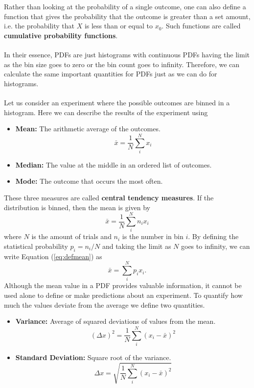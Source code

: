         Rather than looking at the probability of a single outcome, one can also define a function that gives the probability that the outcome is greater than a set amount, i.e. the probability that $X$ is less than or equal to $x_0$. Such functions are called \textbf{cumulative probability functions}.\\
        \\
        In their essence, PDFs are just histograms with continuous PDFs having the limit as the bin size goes to zero or the bin count goes to infinity. Therefore, we can calculate the same important quantities for PDFs just as we can do for histograms.\\
        \\
        Let us consider an experiment where the possible outcomes are binned in a histogram. Here we can describe the results of the experiment using 
        \begin{itemize}
            \item \textbf{Mean:} The arithmetic average of the outcomes. 
            \begin{equation}
                \bar{x} = \frac{1}{N}\sum_i^N x_i
            \end{equation}
            \item \textbf{Median:} The value at the middle in an ordered list of outcomes.
            \item \textbf{Mode:} The outcome that occurs the most often.
        \end{itemize}
        These three measures are called \textbf{central tendency measures}. If the distribution is binned, then the mean is given by
        \begin{equation}
            \bar{x} = \frac{1}{N}\sum_i^Nn_ix_i
            \label{eq:defmean}
        \end{equation}
        where $N$ is the amount of trials and $n_i$ is the number in bin $i$. By defining the statistical probability $p_i = n_i/N$ and taking the limit as $N$ goes to infinity, we can write Equation (\ref{eq:defmean}) as
        \begin{equation}
            \bar{x} = \sum_i^Np_ix_i.
        \end{equation}
        Although the mean value in a PDF provides valuable information, it cannot be used alone to define or make predictions about an experiment. To quantify how much the values deviate from the average we define two quantities. 
        \begin{itemize}
            \item \textbf{Variance:} Average of squared deviations of values from the mean.
            \begin{equation}
                (\Delta x)^2 = \frac{1}{N}\sum_i^N(x_i-\bar{x})^2
            \end{equation}
            \item \textbf{Standard Deviation:} Square root of the variance.
            \begin{equation}
                \Delta x = \sqrt{\frac{1}{N}\sum_i^N(x_i-\bar{x})^2}
            \end{equation}
        \end{itemize}
